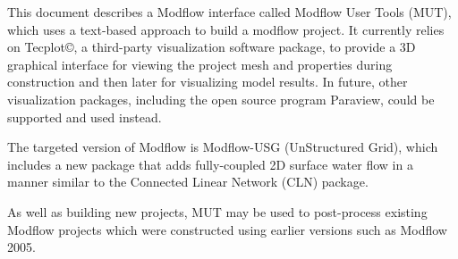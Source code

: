 This document describes a Modflow interface called Modflow User Tools (MUT), which uses a
text-based approach to build a modflow project.  It currently relies on Tecplot\copyright, a third-party visualization software package,
to provide a 3D graphical interface for viewing the project mesh and properties during construction and then later for visualizing model results. In future, other visualization packages, including the open source program Paraview, could be supported and used instead.

The targeted version of Modflow is Modflow-USG (UnStructured Grid), which includes a new package that adds fully-coupled 2D surface water flow in a manner similar to the Connected Linear Network (CLN) package.

As well as building new projects, MUT may be used to post-process existing Modflow projects which were constructed using earlier versions such as Modflow 2005.       